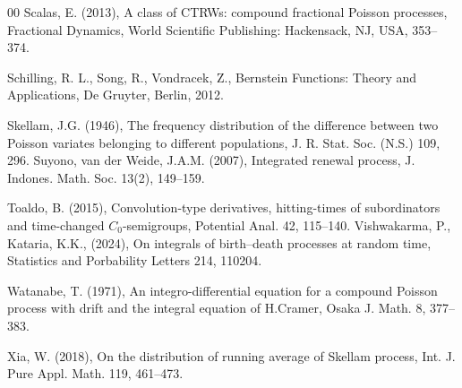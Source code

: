 \documentclass[12pt, twoside, english, headsepline]{article}
\theoremstyle{definition} %
\numberwithin{equation}{section} %
\begin{document}
{\begin{thebibliography}{00}
Scalas, E. (2013), A class of CTRWs: compound fractional Poisson processes, Fractional Dynamics, World Scientific Publishing: Hackensack, NJ, USA, 353--374.

Schilling, R. L., Song, R., Vondracek, Z., Bernstein Functions: Theory and Applications, De Gruyter, Berlin, 2012.

%
%
%
Skellam, J.G. (1946), The frequency distribution of the difference between two Poisson variates belonging to different populations, J. R. Stat. Soc. (N.S.) 109, 296.
%
Suyono, van der Weide, J.A.M. (2007), Integrated renewal process, J. Indones. Math. Soc. 13(2), 149--159.

Toaldo, B. (2015), Convolution-type derivatives, hitting-times of subordinators and time-changed $C_0$-semigroups, Potential Anal. 42, 115--140.
%
%
Vishwakarma, P., Kataria, K.K., (2024), On integrals of birth–death processes at random time, Statistics and Porbability Letters 214, 110204.

Watanabe, T. (1971), An integro-differential equation for a compound Poisson process with drift and the integral equation of H.Cramer, Osaka J. Math. 8, 377--383.

Xia, W. (2018), On the distribution of running average of Skellam process, Int. J. Pure Appl. Math. 119, 461--473.

\end{thebibliography}
}
\end{document}
